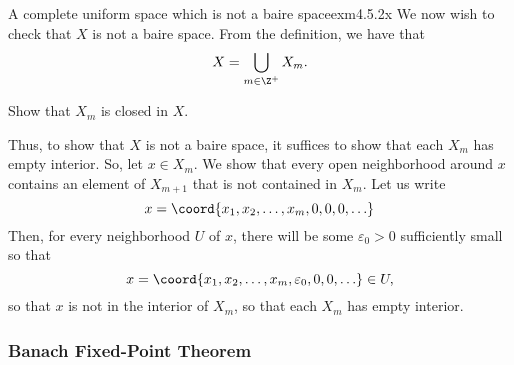 \begin{exm}{A complete uniform space which is not a baire space}{exm4.5.2x}
We now wish to check that $X$ is not a baire space.  From the definition, we have that
\begin{equation}
X=\bigcup _{m\in \Z ^+}X_m.
\end{equation}
\begin{exr}[breakable=false]{}{}
Show that $X_m$ is closed in $X$.
\end{exr}
Thus, to show that $X$ is not a baire space, it suffices to show that each $X_m$ has empty interior.  So, let $x\in X_m$.  We show that every open neighborhood around $x$ contains an element of $X_{m+1}$ that is not contained in $X_m$.  Let us write
\begin{equation}
x=\coord{x_1,x_2,\ldots ,x_m,0,0,0,\ldots}
\end{equation}
Then, for every neighborhood $U$ of $x$, there will be some $\varepsilon _0>0$ sufficiently small so that
\begin{equation}
x=\coord{x_1,x_2,\ldots ,x_m,\varepsilon _0,0,0,\ldots}\in U,
\end{equation}
so that $x$ is not in the interior of $X_m$, so that each $X_m$ has empty interior.
\end{exm}

\subsubsection{Banach Fixed-Point Theorem}

